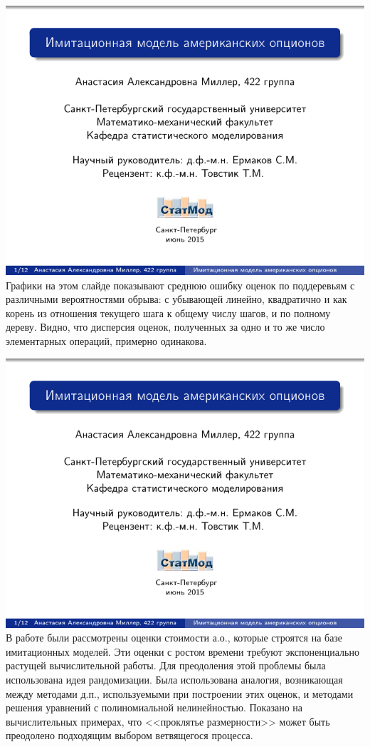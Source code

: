 \documentclass[14pt,a4paper]{extarticle}
\begin{document}
\includegraphics[page=\theslidenumber, width=\textwidth]{8th-semester-presentation.pdf}
Графики на этом слайде показывают среднюю ошибку оценок по поддеревьям с различными вероятностями обрыва: с убывающей линейно, квадратично и как корень из отношения текущего шага к общему числу шагов, и по полному дереву. Видно, что дисперсия оценок, полученных за одно и то же число элементарных операций, примерно одинакова.

\includegraphics[page=\theslidenumber, width=\textwidth]{8th-semester-presentation.pdf}
В работе были рассмотрены оценки стоимости а.о., которые строятся на базе имитационных моделей. Эти оценки с ростом времени требуют экспоненциально растущей вычислительной работы. Для преодоления этой проблемы была использована идея рандомизации. Была использована аналогия, возникающая между методами д.п., используемыми при построении этих оценок, и методами решения уравнений с полиномиальной нелинейностью. Показано на вычислительных примерах, что <<проклятье размерности>> может быть преодолено подходящим выбором ветвящегося процесса.
\end{document}
